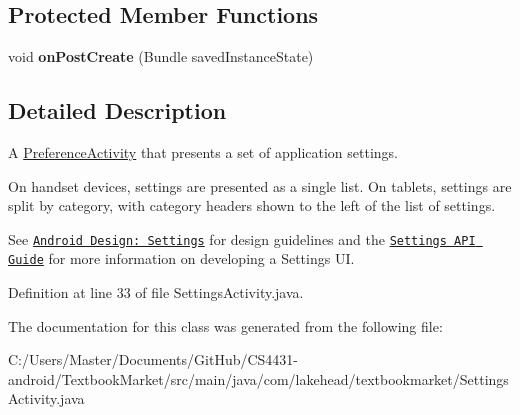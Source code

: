 \subsection*{Protected Member Functions}
\begin{DoxyCompactItemize}
\item 
\hypertarget{classcom_1_1lakehead_1_1textbookmarket_1_1_settings_activity_aace7a6404354dfa074f6e671b2e9f200}{void {\bfseries on\-Post\-Create} (Bundle saved\-Instance\-State)}\label{classcom_1_1lakehead_1_1textbookmarket_1_1_settings_activity_aace7a6404354dfa074f6e671b2e9f200}

\end{DoxyCompactItemize}


\subsection{Detailed Description}
A \hyperlink{}{Preference\-Activity} that presents a set of application settings. 

On handset devices, settings are presented as a single list. On tablets, settings are split by category, with category headers shown to the left of the list of settings. 

See \href{http://developer.android.com/design/patterns/settings.html}{\tt Android Design\-: Settings} for design guidelines and the \href{http://developer.android.com/guide/topics/ui/settings.html}{\tt Settings A\-P\-I Guide} for more information on developing a Settings U\-I. 

Definition at line 33 of file Settings\-Activity.\-java.



The documentation for this class was generated from the following file\-:\begin{DoxyCompactItemize}
\item 
C\-:/\-Users/\-Master/\-Documents/\-Git\-Hub/\-C\-S4431-\/android/\-Textbook\-Market/src/main/java/com/lakehead/textbookmarket/Settings\-Activity.\-java\end{DoxyCompactItemize}
